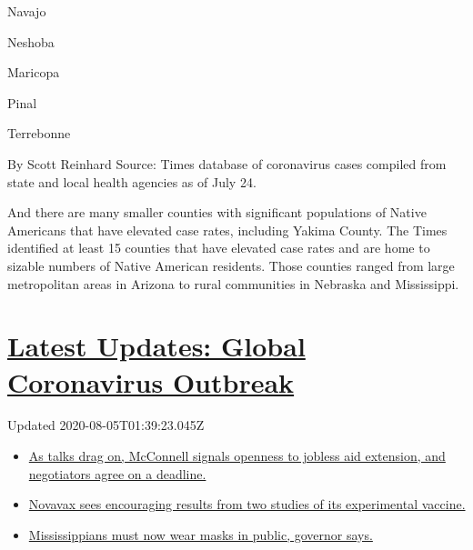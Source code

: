 Navajo

Neshoba

Maricopa

Pinal

Terrebonne

By Scott Reinhard \textbar{} Source: Times database of coronavirus cases
compiled from state and local health agencies as of July 24.

And there are many smaller counties with significant populations of
Native Americans that have elevated case rates, including Yakima County.
The Times identified at least 15 counties that have elevated case rates
and are home to sizable numbers of Native American residents. Those
counties ranged from large metropolitan areas in Arizona to rural
communities in Nebraska and Mississippi.

\hypertarget{latest-updates-global-coronavirus-outbreak}{%
\section{\texorpdfstring{\href{https://www.nytimes.com/2020/08/04/world/coronavirus-cases.html?action=click\&pgtype=Article\&state=default\&region=MAIN_CONTENT_1\&context=storylines_live_updates}{Latest
Updates: Global Coronavirus
Outbreak}}{Latest Updates: Global Coronavirus Outbreak}}\label{latest-updates-global-coronavirus-outbreak}}

Updated 2020-08-05T01:39:23.045Z

\begin{itemize}
\tightlist
\item
  \href{https://www.nytimes.com/2020/08/04/world/coronavirus-cases.html?action=click\&pgtype=Article\&state=default\&region=MAIN_CONTENT_1\&context=storylines_live_updates\#link-762df92}{As
  talks drag on, McConnell signals openness to jobless aid extension,
  and negotiators agree on a deadline.}
\item
  \href{https://www.nytimes.com/2020/08/04/world/coronavirus-cases.html?action=click\&pgtype=Article\&state=default\&region=MAIN_CONTENT_1\&context=storylines_live_updates\#link-1228a480}{Novavax
  sees encouraging results from two studies of its experimental
  vaccine.}
\item
  \href{https://www.nytimes.com/2020/08/04/world/coronavirus-cases.html?action=click\&pgtype=Article\&state=default\&region=MAIN_CONTENT_1\&context=storylines_live_updates\#link-794484ed}{Mississippians
  must now wear masks in public, governor says.}
\end{itemize}

